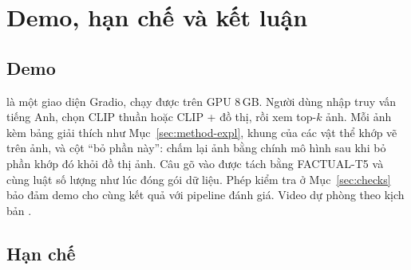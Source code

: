 \section{Demo, hạn chế và kết luận}
\label{sec:conclusion}

\subsection{Demo}
\label{sec:demo}

 là một giao diện Gradio, chạy được trên GPU 8\,GB. Người dùng nhập truy vấn tiếng Anh, chọn CLIP thuần
hoặc CLIP + đồ thị, rồi xem top-$k$ ảnh. Mỗi ảnh kèm bảng giải thích như Mục~\ref{sec:method-expl}, khung của các vật thể khớp
vẽ trên ảnh, và cột ``bỏ phần này'': chấm lại ảnh bằng chính mô hình sau khi bỏ phần khớp đó khỏi đồ thị ảnh. Câu gõ vào được
tách bằng FACTUAL-T5 và cùng luật số lượng như lúc đóng gói dữ liệu. Phép kiểm tra ở Mục~\ref{sec:checks} bảo đảm demo cho
cùng kết quả với pipeline đánh giá. Video dự phòng theo kịch bản .

\subsection{Hạn chế}

